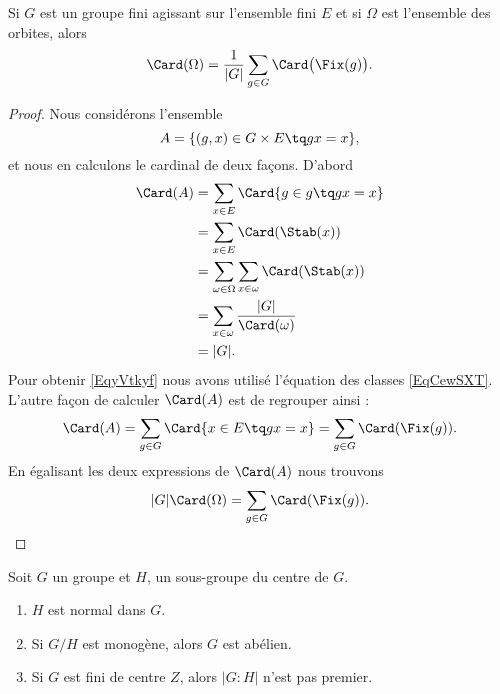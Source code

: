\begin{theorem}  
    Si \( G\) est un groupe fini agissant sur l'ensemble fini \( E\) et si \( \Omega\) est l'ensemble des orbites, alors
    \begin{equation}    \label{EqTUsblv}
        \Card(\Omega)=\frac{1}{ | G | }\sum_{g\in G}\Card\big( \Fix(g) \big).
    \end{equation}
\end{theorem}

\begin{proof}
    Nous considérons l'ensemble 
    \begin{equation}
        A=\{ (g,x)\in G\times E\tq gx=x \},
    \end{equation}
    et nous en calculons le cardinal de deux façons. D'abord
    \begin{subequations}
        \begin{align}
            \Card(A)&=\sum_{x\in E}\Card\{ g\in g\tq gx=x \}\\
            &=\sum_{x\in E}\Card(\Stab(x))\\
            &=\sum_{\omega\in \Omega}\sum_{x\in \omega}\Card(\Stab(x))\\
            &=\sum_{x\in \omega}\frac{ | G | }{ \Card(\omega) }     \label{EqyVtkyf}\\
            &=| G |.
        \end{align}
    \end{subequations}
    Pour obtenir \eqref{EqyVtkyf} nous avons utilisé l'équation des classes \eqref{EqCewSXT}. L'autre façon de calculer \( \Card(A)\) est de regrouper ainsi :
    \begin{equation}
        \Card(A)=\sum_{g\in G}\Card\{ x\in E\tq gx=x \}=\sum_{g\in G}\Card(\Fix(g)).
    \end{equation}
    En égalisant les deux expressions de \( \Card(A)\) nous trouvons
    \begin{equation}
        | G |\Card(\Omega)=\sum_{g\in G}\Card(\Fix(g)).
    \end{equation}
\end{proof}

\begin{proposition}
    Soit \( G\) un groupe et \( H\), un sous-groupe du centre de \( G\).
    \begin{enumerate}
        \item
            \( H\) est normal dans \( G\).
        \item
            Si \( G/H\) est monogène, alors \( G\) est abélien.
        \item
            Si \( G\) est fini de centre \( Z\), alors \( | G:H |\) n'est pas premier.
    \end{enumerate}
\end{proposition}

